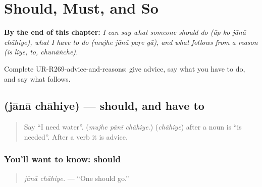 
\chapter{Should, Must, and So}
\label{ch:ur-should-must-and-so}

\begin{chapteropening}
\textbf{By the end of this chapter:} \emph{I can say what someone should do (āp ko jānā chāhiye), what I have to do (mujhe jānā paṛe gā), and what follows from a reason (is liye, to, chunāṅche).}

Complete UR-R269-advice-and-reasons: give advice, say what you have to do, and say what follows.
\end{chapteropening}

\section[\texorpdfstring{\ur{جانا} \ur{چاہیے} (jānā chāhiye)}{جانا چاہیے (jānā chāhiye)}]{  (jānā chāhiye) — should, and have to}

\label{lesson:UR-C269-jana-chahiye}



\begin{quote}
Say \textquotedblleft{}I need water\textquotedblright{}. (\emph{mujhe pānī chāhiye}.) \textbf{} (\emph{chāhiye}) after a noun is \textquotedblleft{}is needed\textquotedblright{}. After a verb it is advice.
\end{quote}

\subsection*{You'll want to know: should}
\begin{quote}
\textbf{ }
\end{quote}

\begin{quote}
\emph{jānā chāhiye.} — \textquotedblleft{}One should go.\textquotedblright{}
\end{quote}

\begin{quote}
\textbf{   }
\end{quote}

